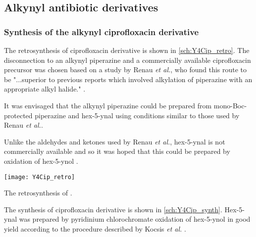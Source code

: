 \subsection{Alkynyl antibiotic derivatives}

\subsubsection{Synthesis of the alkynyl ciprofloxacin derivative \label{sec:Y4Cip}}

The retrosynthesis of ciprofloxacin derivative  is shown in \ref{sch:Y4Cip_retro}. The disconnection to an alkynyl piperazine  and a commercially available ciprofloxacin precursor  was chosen based on a study by Renau \textit{et al.}, who found this route to be "...superior to previous reports which involved alkylation of piperazine with an appropriate alkyl halide." \cite{Renau1996,JPS:JPS2600571210}. 

It was envisaged that the alkynyl piperazine  could be prepared from mono-Boc-protected piperazine  and hex-5-ynal  using conditions similar to those used by Renau \textit{et al.}\cite{Renau1996}.

Unlike the aldehydes and ketones used by Renau \textit{et al.}\cite{Renau1996}, hex-5-ynal  is not commercially available and so it was hoped that this could be prepared by oxidation of hex-5-ynol .


\begin{scheme}[H]
	\begin{center}
		\texttt{[image: Y4Cip\_retro]}
		\caption{The retrosynthesis of . \label{sch:Y4Cip_retro}}
	\end{center}
\end{scheme}


The synthesis of ciprofloxacin derivative  is shown in \ref{sch:Y4Cip_synth}. Hex-5-ynal  was prepared by pyridinium chlorochromate oxidation of hex-5-ynol  in good yield according to the procedure described by Kocsis \textit{et al.} \cite{Kocsis2012}. 

